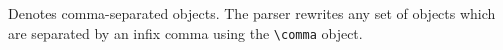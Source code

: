 
Denotes comma-separated objects.  The parser rewrites any set of 
objects which are separated by an infix comma using the \verb|\comma| object.



